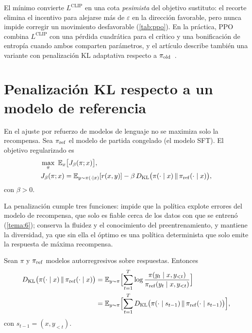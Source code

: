 El mínimo convierte $L^{\mathrm{CLIP}}$ en una cota \emph{pesimista} del objetivo sustituto: el recorte elimina el incentivo para alejarse más de $\varepsilon$ en la dirección favorable, pero nunca impide corregir un movimiento desfavorable (\cref{tab:ppo}). En la práctica, PPO combina $L^{\mathrm{CLIP}}$ con una pérdida cuadrática para el crítico y una bonificación de entropía cuando ambos comparten parámetros, y el artículo describe también una variante con penalización KL adaptativa respecto a $\pi_{\mathrm{old}}$~\cite[§4]{ppo}.

\section{Penalización KL respecto a un modelo de referencia}

En el ajuste por refuerzo de modelos de lenguaje no se maximiza solo la recompensa. Sea $\pi_{\mathrm{ref}}$ el modelo de partida congelado (el modelo SFT). El objetivo regularizado es~\cite{instructgpt}
\begin{equation}\label{eq:obj-kl}
\begin{aligned}&\max_{\pi}\ \mathbb{E}_{x}\bigl[J_\beta(\pi;x)\bigr],\\ &J_\beta(\pi;x)=\mathbb{E}_{y\sim\pi(\cdot\mid x)}[r(x,y)]-\beta\,D_{\mathrm{KL}}\bigl(\pi(\cdot\mid x)\,\|\,\pi_{\mathrm{ref}}(\cdot\mid x)\bigr),\end{aligned}
\end{equation}
con $\beta>0$.

La penalización cumple tres funciones: impide que la política explote errores del modelo de recompensa, que solo es fiable cerca de los datos con que se entrenó (\cref{tema:6}); conserva la fluidez y el conocimiento del preentrenamiento, y mantiene la diversidad, ya que sin ella el óptimo es una política determinista que solo emite la respuesta de máxima recompensa.

\begin{proposicion}\label{prop:kl-tokens}
Sean $\pi$ y $\pi_{\mathrm{ref}}$ modelos autorregresivos sobre respuestas. Entonces
\[
\begin{aligned}
D_{\mathrm{KL}}\bigl(\pi(\cdot\mid x)\,\|\,\pi_{\mathrm{ref}}(\cdot\mid x)\bigr)&=\mathbb{E}_{y\sim\pi}\Bigl[\sum_{t=1}^{T}\log\frac{\pi(y_t\mid x,y_{<t})}{\pi_{\mathrm{ref}}(y_t\mid x,y_{<t})}\Bigr]\\
&=\mathbb{E}_{y\sim\pi}\Bigl[\sum_{t=1}^{T}D_{\mathrm{KL}}\bigl(\pi(\cdot\mid s_{t-1})\,\|\,\pi_{\mathrm{ref}}(\cdot\mid s_{t-1})\bigr)\Bigr],
\end{aligned}
\]
con $s_{t-1}=(x,y_{<t})$.
\end{proposicion}

